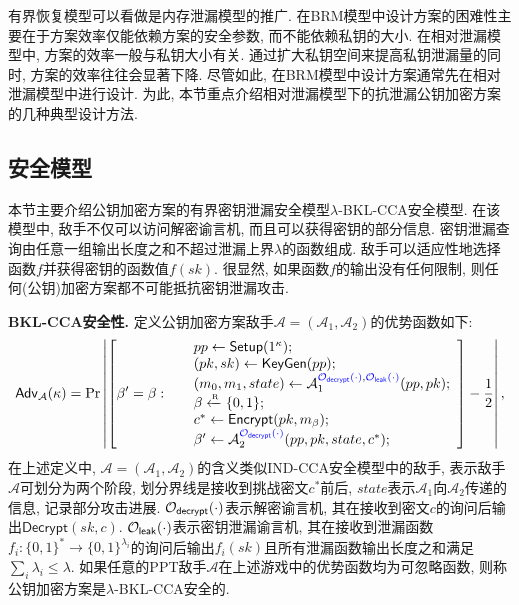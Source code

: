 有界恢复模型可以看做是内存泄漏模型的推广. 在BRM模型中设计方案的困难性主要在于方案效率仅能依赖方案的安全参数, 而不能依赖私钥的大小. 在相对泄漏模型中, 方案的效率一般与私钥大小有关. 通过扩大私钥空间来提高私钥泄漏量的同时, 方案的效率往往会显著下降. 尽管如此, 在BRM模型中设计方案通常先在相对泄漏模型中进行设计. 为此, 本节重点介绍相对泄漏模型下的抗泄漏公钥加密方案的几种典型设计方法.

\subsection{安全模型}
本节主要介绍公钥加密方案的有界密钥泄漏安全模型$\lambda$-BKL-CCA安全模型. 在该模型中, 敌手不仅可以访问解密谕言机, 而且可以获得密钥的部分信息. 密钥泄漏查询由任意一组输出长度之和不超过泄漏上界$\lambda$的函数组成. 敌手可以适应性地选择函数$f$并获得密钥的函数值$f(sk)$. 很显然, 如果函数$f$的输出没有任何限制, 则任何(公钥)加密方案都不可能抵抗密钥泄漏攻击.
\begin{trivlist}
\item \textbf{BKL-CCA安全性.} 定义公钥加密方案敌手$\mathcal{A} = (\mathcal{A}_1, \mathcal{A}_2)$的优势函数如下: 
\begin{displaymath}
	\mathsf{Adv}_\mathcal{A}(\kappa) = \Pr\left| \left[ \beta' = \beta:~
	\begin{array}{ll}
		& pp \leftarrow \mathsf{Setup}(1^\kappa); \\		
		& (pk, sk) \leftarrow \mathsf{KeyGen}(pp);\\
		& (m_0, m_1, state) \leftarrow \mathcal{A}_1^{{\color{blue} \mathcal{O}_\mathsf{decrypt}(\cdot)},{\color{blue} \mathcal{O}_\mathsf{leak}(\cdot)}}(pp, pk); \\
		& \beta \xleftarrow{\textup{\tiny R}} \{0,1\};\\ 
        & c^* \leftarrow \mathsf{Encrypt}(pk, m_\beta);\\
        & \beta' \leftarrow \mathcal{A}_2^{{\color{blue} \mathcal{O}_\mathsf{decrypt}(\cdot)}}(pp, pk, state, c^*);
	\end{array} 
\right] - \frac{1}{2}\right|,
\end{displaymath}
在上述定义中, $\mathcal{A} = (\mathcal{A}_1, \mathcal{A}_2)$的含义类似IND-CCA安全模型中的敌手, 表示敌手$\mathcal{A}$可划分为两个阶段, 划分界线是接收到挑战密文$c^*$前后, $state$表示$\mathcal{A}_1$向$\mathcal{A}_2$传递的信息, 记录部分攻击进展. $\mathcal{O}_\mathsf{decrypt}(\cdot)$表示解密谕言机, 其在接收到密文$c$的询问后输出$\mathsf{Decrypt}(sk, c)$. $\mathcal{O}_\mathsf{leak}(\cdot)$表示密钥泄漏谕言机, 其在接收到泄漏函数$f_i: \{0, 1\}^*\rightarrow\{0, 1\}^{\lambda_i}$的询问后输出$f_i(sk)$且所有泄漏函数输出长度之和满足$\sum_i\lambda_i\leq \lambda$. 如果任意的PPT敌手$\mathcal{A}$在上述游戏中的优势函数均为可忽略函数, 则称公钥加密方案是$\lambda$-BKL-CCA安全的.  
\end{trivlist}

